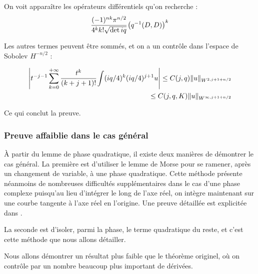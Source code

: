 On voit apparaître les opérateurs différentiels qu'on recherche :
\begin{equation}
\label{eq:coeffquad}
\cfrac{(-1)^{nk}\pi^{n/2}}{4^kk!\sqrt{\det{iq}}}\left(q^{-1}(D,D)\right)^k
\end{equation}

Les autres termes peuvent être sommés, et on a un contrôle dans l'espace de Sobolev $H^{-n/2}$ :

\begin{align*}
	\left|t^{-j-1}\sum_{k=0}^{+\infty}\cfrac{t^k}{(k+j+1)!}\int (iq/4)^k(iq/4)^{j+1}u\right| \leq C(j,q)\|u\|_{W^{2,j+1+n/2}}\\
	\leq C(j,q,K)\|u\|_{W^{\infty,j+1+n/2}}
\end{align*}

Ce qui conclut la preuve.

\subsubsection{Preuve affaiblie dans le cas général}
À partir du lemme de phase quadratique, il existe deux manières de démontrer le cas général. La première est d'utiliser le lemme de Morse pour se ramener, après un changement de variable, à une phase quadratique. Cette méthode présente néanmoins de nombreuses difficultés supplémentaires dans le cas d'une phase complexe puisqu'au lieu d'intégrer le long de l'axe réel, on intègre maintenant sur une courbe tangente à l'axe réel en l'origine. Une preuve détaillée est explicitée dans \cite{melin1975fourier}.

La seconde est d'isoler, parmi la phase, le terme quadratique du reste, et c'est cette méthode que nous allons détailler. 

Nous allons démontrer un résultat plus faible que le théorème originel, où on contrôle par un nombre beaucoup plus important de dérivées.

